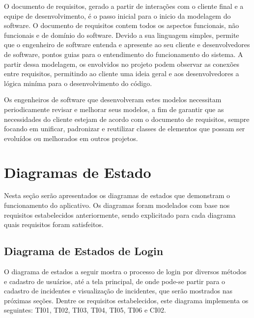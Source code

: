 \documentclass[12pt]{article}
\begin{document}
O documento de requisitos, gerado a partir de interações com o cliente final e a equipe de desenvolvimento, é o passo inicial para o inicio da modelagem do software. O documento de requisitos contem todos os aspectos funcionais, não funcionais e de domínio do software. Devido a sua linguagem simples, permite que o engenheiro de software entenda e apresente ao seu cliente e desenvolvedores de software, pontos guias para o entendimento do funcionamento do sistema. A partir dessa modelagem, os envolvidos no projeto podem observar as conexões entre requisitos, permitindo ao cliente uma ideia geral e aos desenvolvedores a lógica miníma para o desenvolvimento do código.

Os engenheiros de software que desenvolveram estes modelos necessitam periodicamente revisar e melhorar seus modelos, a fim de garantir que as necessidades do cliente estejam de acordo com o documento de requisitos, sempre focando em unificar, padronizar e reutilizar classes de elementos que possam ser evoluídos ou melhorados em outros projetos.

%
%

\section{Diagramas de Estado}%

Nesta seção serão apresentados os diagramas de estados que demonstram o funcionamento do aplicativo. Os diagramas foram modelados com base nos requisitos estabelecidos anteriormente, sendo explicitado para cada diagrama quais requisitos foram satisfeitos.

\subsection{Diagrama de Estados de Login}

O diagrama de estados a seguir mostra o processo de login por diversos métodos e cadastro de usuários, até a tela principal, de onde pode-se partir para o cadastro de incidentes e visualização de incidentes, que serão mostrados nas próximas seções. Dentre os requisitos estabelecidos, este diagrama implementa os seguintes: TI01, TI02, TI03, TI04, TI05, TI06 e CI02.
\end{document}
